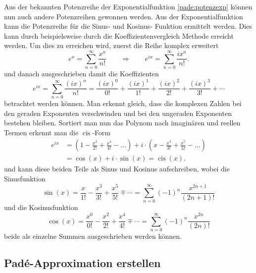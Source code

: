 Aus der bekannten Potenzreihe der Exponentialfunktion \eqref{pade:potenzexp} können nun auch andere Potenzreihen gewonnen werden.
Aus der Exponentialfunktion kann die Potenzreihe für die Sinus- und Kosinus- Funktion ermittelt werden.
Dies kann durch beispielsweise durch die Koeffizientenvergleich Methode erreicht werden. 
Um dies zu erreichen wird, zuerst die Reihe komplex erweitert
\begin{equation*}
e^{x}
=
\sum_{n=0}^{\infty} \frac{x^{n}}{n !}
\qquad\Rightarrow\qquad
e^{ix}
=
\sum_{n=0}^{\infty} \frac{ix^{n}}{n !}.
\end{equation*}
und danach ausgeschrieben damit die Koeffizienten   
\begin{equation}
e^{ix}
=
\sum_{n=0}^{\infty} \frac{(ix)^{n}}{n !}
=
\frac{(ix)^{0}}{0 !}+\frac{(ix)^{1}}{1 !}+\frac{(ix)^{2}}{2 !}+\frac{(ix)^{3}}{3 !}+\cdots
\end{equation}
betrachtet werden können.
Man erkennt gleich, dass die komplexen Zahlen bei den geraden Exponenten verschwinden und bei den ungeraden Exponenten bestehen bleiben. 
Sortiert man nun das Polynom nach imaginären und reellen Termen erkennt man die $\operatorname{cis}$-Form 
\begin{align*}
e^{ix}
&=
\left(1-\frac{x^{2}}{2 !}+\frac{x^{4}}{4 !}-\ldots\right)+i \cdot\left(x-\frac{x^{3}}{3 !}+\frac{x^{5}}{5 !}-\ldots\right)
\\
&=
\cos(x)+i\cdot \sin(x) = \operatorname{cis}(x).
\end{align*}
und kann diese beiden Teile als Sinus und Kosinus aufschreiben,
wobei die Sinusfunktion 
\begin{equation*}
\sin (x)
=
\frac{x}{1 !}-\frac{x^{3}}{3 !}+\frac{x^{5}}{5 !} \mp \cdots
=
\sum_{n=0}^{\infty}(-1)^{n} \frac{x^{2 n+1}}{(2 n+1) !}
\end{equation*}
und die Kosinusfunktion 
\begin{equation*}
\cos (x)
=
\frac{x^{0}}{0 !}-\frac{x^{2}}{2 !}+\frac{x^{4}}{4 !} \mp \cdots
=
\sum_{n=0}^{\infty}(-1)^{n} \frac{x^{2 n}}{(2 n) !}
\end{equation*}
beide als einzelne Summen ausgeschrieben werden können.



\subsection{Padé-Approximation erstellen
	\label{pade:subsection:Pade_erstellen}}

